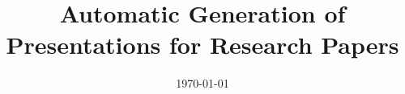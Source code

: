 \documentclass[a4paper, 11pt]{uis-thesis}
\numberwithin{algorithm}{chapter}
\begin{document}
\frontmatter	  %



\title{Automatic Generation of Presentations for Research Papers}
\addresses{\groupname\\\deptname\\\univname}  %
\date       {\today}
\subject    {}
\keywords   {}

\maketitle





\pagestyle{empty}  %
% 

\clearpage

\clearpage

\clearpage

\tableofcontents



\mainmatter	  %
\pagestyle{fancy}  %

\end{document}
